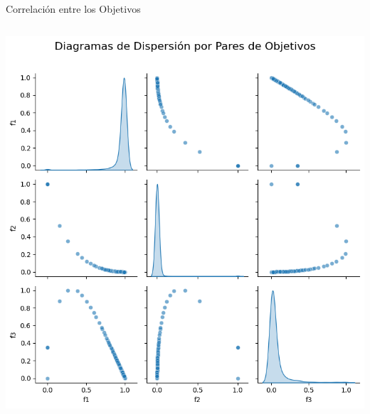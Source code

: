\documentclass[aspectratio=169,xcolor=dvipsnames]{beamer}
\begin{document}
\begin{frame}{Correlación entre los Objetivos}
\begin{columns}
        \centering
        \includegraphics[width=\textwidth]{img/pareto_projection_moead.png} %
    \end{columns}
    
\end{frame}
\end{document}
